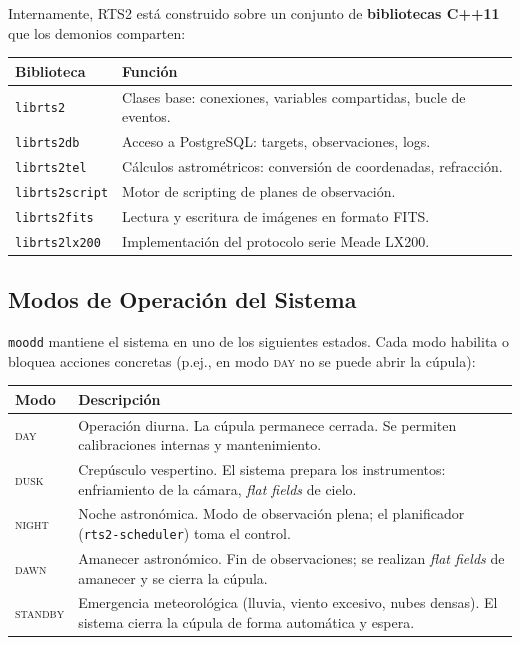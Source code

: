 \documentclass[12pt,a4paper,titlepage]{article}
\begin{document}
Internamente, RTS2 está construido sobre un conjunto de \textbf{bibliotecas C++11} que los demonios comparten:

\begin{center}
\begin{tabular}{lp{9cm}}
  \toprule
  \textbf{Biblioteca} & \textbf{Función} \\
  \midrule
  \texttt{librts2}          & Clases base: conexiones, variables compartidas, bucle de eventos. \\
  \texttt{librts2db}        & Acceso a PostgreSQL: targets, observaciones, logs. \\
  \texttt{librts2tel}       & Cálculos astrométricos: conversión de coordenadas, refracción. \\
  \texttt{librts2script}    & Motor de scripting de planes de observación. \\
  \texttt{librts2fits}      & Lectura y escritura de imágenes en formato FITS. \\
  \texttt{librts2lx200}     & Implementación del protocolo serie Meade LX200. \\
  \bottomrule
\end{tabular}
\end{center}

\subsection{Modos de Operación del Sistema}
\label{sec:modos}

\texttt{moodd} mantiene el sistema en uno de los siguientes estados. Cada modo habilita o bloquea acciones concretas (p.ej., en modo \textsc{day} no se puede abrir la cúpula):

\begin{center}
\begin{tabular}{lp{9.5cm}}
  \toprule
  \textbf{Modo} & \textbf{Descripción} \\
  \midrule
  \textsc{day}     & Operación diurna. La cúpula permanece cerrada. Se permiten calibraciones internas y mantenimiento. \\[3pt]
  \textsc{dusk}    & Crepúsculo vespertino. El sistema prepara los instrumentos: enfriamiento de la cámara, \textit{flat fields} de cielo. \\[3pt]
  \textsc{night}   & Noche astronómica. Modo de observación plena; el planificador (\texttt{rts2-scheduler}) toma el control. \\[3pt]
  \textsc{dawn}    & Amanecer astronómico. Fin de observaciones; se realizan \textit{flat fields} de amanecer y se cierra la cúpula. \\[3pt]
  \textsc{standby} & Emergencia meteorológica (lluvia, viento excesivo, nubes densas). El sistema cierra la cúpula de forma automática y espera. \\
  \bottomrule
\end{tabular}
\end{center}
\end{document}
